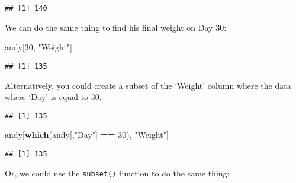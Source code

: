 \documentclass[
]{article}
\newenvironment{Shaded}{\begin{snugshade}}{\end{snugshade}}
\newcommand{\DecValTok}[1]{\textcolor[rgb]{0.00,0.00,0.81}{#1}}
\newcommand{\KeywordTok}[1]{\textcolor[rgb]{0.13,0.29,0.53}{\textbf{#1}}}
\newcommand{\NormalTok}[1]{#1}
\newcommand{\OperatorTok}[1]{\textcolor[rgb]{0.81,0.36,0.00}{\textbf{#1}}}
\newcommand{\StringTok}[1]{\textcolor[rgb]{0.31,0.60,0.02}{#1}}
\begin{document}
\begin{verbatim}
## [1] 140
\end{verbatim}

We can do the same thing to find his final weight on Day 30:

\begin{Shaded}
\begin{Highlighting}[]
\NormalTok{andy[}\DecValTok{30}\NormalTok{, }\StringTok{"Weight"}\NormalTok{]}
\end{Highlighting}
\end{Shaded}

\begin{verbatim}
## [1] 135
\end{verbatim}

Alternatively, you could create a subset of the `Weight' column where
the data where `Day' is equal to 30.

\begin{Shaded}
\end{Shaded}

\begin{verbatim}
## [1] 135
\end{verbatim}

\begin{Shaded}
\begin{Highlighting}[]
\NormalTok{andy[}\KeywordTok{which}\NormalTok{(andy[,}\StringTok{"Day"}\NormalTok{] }\OperatorTok{==}\StringTok{ }\DecValTok{30}\NormalTok{), }\StringTok{"Weight"}\NormalTok{]}
\end{Highlighting}
\end{Shaded}

\begin{verbatim}
## [1] 135
\end{verbatim}

Or, we could use the \texttt{subset()} function to do the same thing:

\begin{Shaded}
\end{Shaded}
\end{document}
